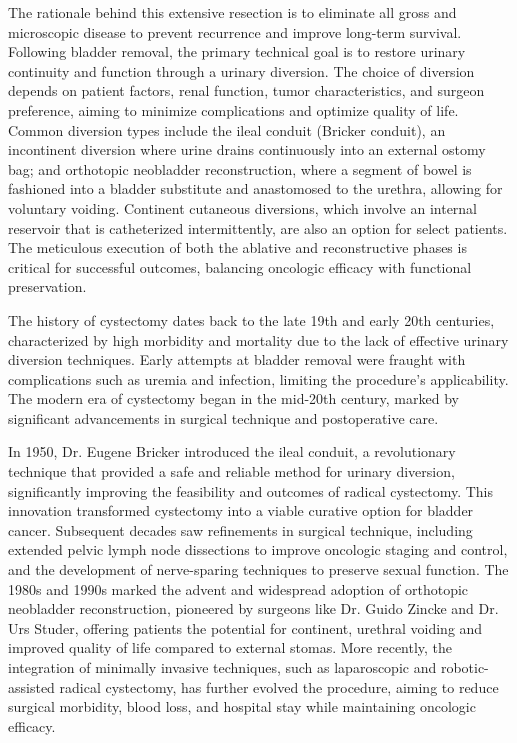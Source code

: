 The rationale behind this extensive resection is to eliminate all gross and microscopic disease to prevent recurrence and improve long-term survival. Following bladder removal, the primary technical goal is to restore urinary continuity and function through a urinary diversion. The choice of diversion depends on patient factors, renal function, tumor characteristics, and surgeon preference, aiming to minimize complications and optimize quality of life. Common diversion types include the ileal conduit (Bricker conduit), an incontinent diversion where urine drains continuously into an external ostomy bag; and orthotopic neobladder reconstruction, where a segment of bowel is fashioned into a bladder substitute and anastomosed to the urethra, allowing for voluntary voiding. Continent cutaneous diversions, which involve an internal reservoir that is catheterized intermittently, are also an option for select patients. The meticulous execution of both the ablative and reconstructive phases is critical for successful outcomes, balancing oncologic efficacy with functional preservation.

The history of cystectomy dates back to the late 19th and early 20th centuries, characterized by high morbidity and mortality due to the lack of effective urinary diversion techniques. Early attempts at bladder removal were fraught with complications such as uremia and infection, limiting the procedure's applicability. The modern era of cystectomy began in the mid-20th century, marked by significant advancements in surgical technique and postoperative care.

In 1950, Dr. Eugene Bricker introduced the ileal conduit, a revolutionary technique that provided a safe and reliable method for urinary diversion, significantly improving the feasibility and outcomes of radical cystectomy. This innovation transformed cystectomy into a viable curative option for bladder cancer. Subsequent decades saw refinements in surgical technique, including extended pelvic lymph node dissections to improve oncologic staging and control, and the development of nerve-sparing techniques to preserve sexual function. The 1980s and 1990s marked the advent and widespread adoption of orthotopic neobladder reconstruction, pioneered by surgeons like Dr. Guido Zincke and Dr. Urs Studer, offering patients the potential for continent, urethral voiding and improved quality of life compared to external stomas. More recently, the integration of minimally invasive techniques, such as laparoscopic and robotic-assisted radical cystectomy, has further evolved the procedure, aiming to reduce surgical morbidity, blood loss, and hospital stay while maintaining oncologic efficacy.

